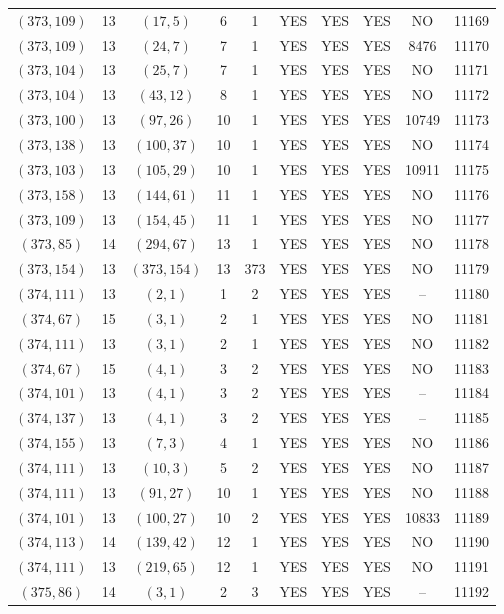 \begin{longtable}{|c|c|c|c|c|c|c|c|c|c|}
$(373, 109)$ & 13 & $(17, 5)$ & 6 & 1 & YES & YES & YES & NO & 11169\\
$(373, 109)$ & 13 & $(24, 7)$ & 7 & 1 & YES & YES & YES & 8476 & 11170\\
$(373, 104)$ & 13 & $(25, 7)$ & 7 & 1 & YES & YES & YES & NO & 11171\\
$(373, 104)$ & 13 & $(43, 12)$ & 8 & 1 & YES & YES & YES & NO & 11172\\
$(373, 100)$ & 13 & $(97, 26)$ & 10 & 1 & YES & YES & YES & 10749 & 11173\\
$(373, 138)$ & 13 & $(100, 37)$ & 10 & 1 & YES & YES & YES & NO & 11174\\
$(373, 103)$ & 13 & $(105, 29)$ & 10 & 1 & YES & YES & YES & 10911 & 11175\\
$(373, 158)$ & 13 & $(144, 61)$ & 11 & 1 & YES & YES & YES & NO & 11176\\
$(373, 109)$ & 13 & $(154, 45)$ & 11 & 1 & YES & YES & YES & NO & 11177\\
$(373, 85)$ & 14 & $(294, 67)$ & 13 & 1 & YES & YES & YES & NO & 11178\\
$(373, 154)$ & 13 & $(373, 154)$ & 13 & 373 & YES & YES & YES & NO & 11179\\
$(374, 111)$ & 13 & $(2, 1)$ & 1 & 2 & YES & YES & YES & -- & 11180\\
$(374, 67)$ & 15 & $(3, 1)$ & 2 & 1 & YES & YES & YES & NO & 11181\\
$(374, 111)$ & 13 & $(3, 1)$ & 2 & 1 & YES & YES & YES & NO & 11182\\
$(374, 67)$ & 15 & $(4, 1)$ & 3 & 2 & YES & YES & YES & NO & 11183\\
$(374, 101)$ & 13 & $(4, 1)$ & 3 & 2 & YES & YES & YES & -- & 11184\\
$(374, 137)$ & 13 & $(4, 1)$ & 3 & 2 & YES & YES & YES & -- & 11185\\
$(374, 155)$ & 13 & $(7, 3)$ & 4 & 1 & YES & YES & YES & NO & 11186\\
$(374, 111)$ & 13 & $(10, 3)$ & 5 & 2 & YES & YES & YES & NO & 11187\\
$(374, 111)$ & 13 & $(91, 27)$ & 10 & 1 & YES & YES & YES & NO & 11188\\
$(374, 101)$ & 13 & $(100, 27)$ & 10 & 2 & YES & YES & YES & 10833 & 11189\\
$(374, 113)$ & 14 & $(139, 42)$ & 12 & 1 & YES & YES & YES & NO & 11190\\
$(374, 111)$ & 13 & $(219, 65)$ & 12 & 1 & YES & YES & YES & NO & 11191\\
$(375, 86)$ & 14 & $(3, 1)$ & 2 & 3 & YES & YES & YES & -- & 11192\\

\end{longtable}
